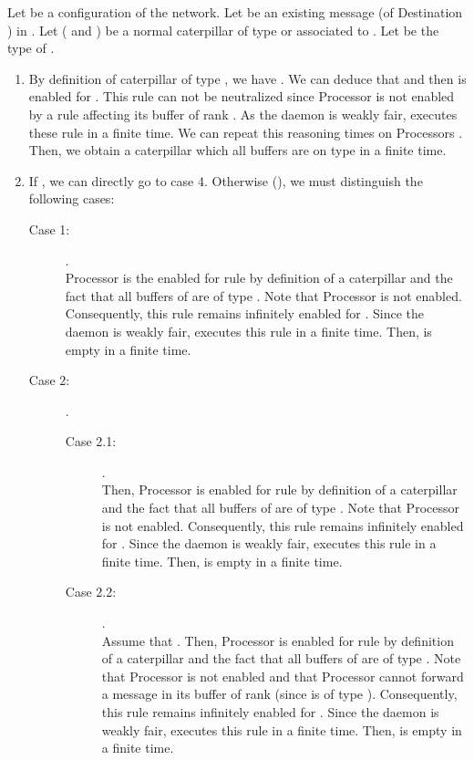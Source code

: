 \documentclass[11pt]{article}
\newenvironment{proof}{{\noindent\bf Proof. } }{{\hfill }}
\begin{document}
\begin{proof}
Let  be a configuration of the network. Let  be an existing message (of Destination ) in . Let  ( and ) be a normal caterpillar of type  or   associated to . Let  be the type of .

\begin{enumerate}
\item By definition of caterpillar of type , we have . We can deduce that  and then  is enabled for . This rule can not be neutralized since Processor  is not enabled by a rule affecting its buffer of rank . As the daemon is weakly fair,  executes these rule in a finite time. We can repeat this reasoning  times on Processors . Then, we obtain a caterpillar which all buffers are on type  in a finite time.
\item If , we can directly go to case 4. Otherwise (), we must distinguish the following cases:

\begin{description}
\item [Case 1:] .\\
Processor  is the enabled for rule  by definition of a caterpillar and the fact that all buffers of  are of type . Note that Processor  is not enabled. Consequently, this rule remains infinitely enabled for . Since the daemon is weakly fair,  executes this rule in a finite time. Then,  is empty in a finite time.
\item [Case 2:] .\\

\begin{description}
\item [Case 2.1:] .\\
Then, Processor  is enabled for rule  by definition of a caterpillar and the fact that all buffers of  are of type . Note that Processor  is not enabled. Consequently, this rule remains infinitely enabled for . Since the daemon is weakly fair,  executes this rule in a finite time. Then,  is empty in a finite time.
\item [Case 2.2:] .\\
Assume that . Then, Processor  is enabled for rule  by definition of a caterpillar and the fact that all buffers of  are of type . Note that Processor  is not enabled and that Processor  cannot forward a message  in its buffer of rank  (since  is of type ). Consequently, this rule remains infinitely enabled for . Since the daemon is weakly fair,  executes this rule in a finite time. Then,  is empty in a finite time.
\end{description}


\end{description}
\end{enumerate}
\end{proof}
\end{document}
